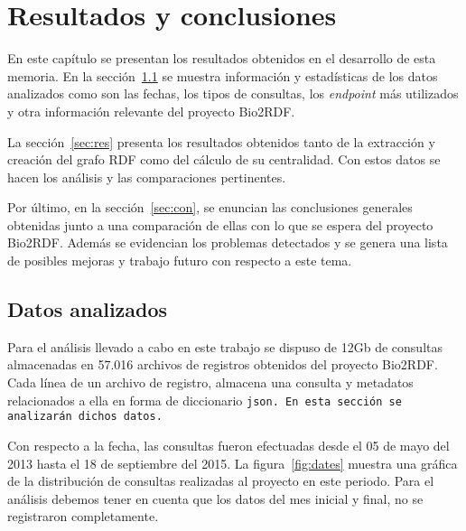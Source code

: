 \chapter{Resultados y conclusiones}
En este capítulo se presentan los resultados obtenidos en el desarrollo de esta
memoria.
En la sección~\ref{sec:datos} se muestra información y estadísticas de los datos
analizados como son las fechas, los tipos de consultas, los \emph{endpoint} más
utilizados y otra información relevante del proyecto Bio2RDF.

La sección~\ref{sec:res} presenta los resultados obtenidos tanto de la
extracción y creación del grafo RDF como del cálculo de su centralidad. Con
estos datos se hacen los análisis y las comparaciones pertinentes.

Por último, en la sección~\ref{sec:con}, se enuncian las conclusiones generales
obtenidas junto a una comparación de ellas con lo que se espera del proyecto
Bio2RDF. Además se evidencian los problemas detectados y se genera una lista de
posibles mejoras y trabajo futuro con respecto a este tema.


\section{Datos analizados}\label{sec:datos}
Para el análisis llevado a cabo en este trabajo se dispuso de 12Gb de consultas
almacenadas en 57.016 archivos de registros obtenidos del proyecto Bio2RDF.
Cada línea de un archivo de registro, almacena una consulta y metadatos 
relacionados a ella en forma de diccionario \tt{json}. En esta sección se
analizarán dichos datos.

Con respecto a la fecha, las consultas fueron efectuadas desde el 05 de mayo del
2013 hasta el 18 de septiembre del 2015.
La figura~\ref{fig:dates} muestra una gráfica de la distribución de consultas
realizadas al proyecto en este periodo.
Para el análisis debemos tener en cuenta que los datos del mes inicial y final,
no se registraron completamente.

